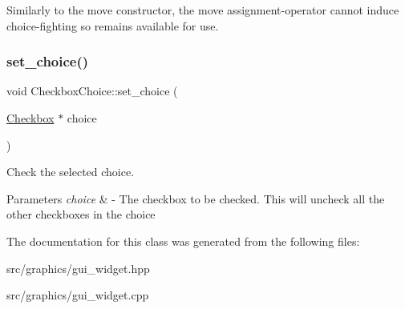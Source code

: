 Similarly to the move constructor, the move assignment-\/operator cannot induce choice-\/fighting so remains available for use. \mbox{\label{class_checkbox_choice_a02298a96989fb9c74de92e3094a51466}} 
\subsubsection{\texorpdfstring{set\+\_\+choice()}{set\_choice()}}
{\footnotesize\ttfamily void Checkbox\+Choice\+::set\+\_\+choice (\begin{DoxyParamCaption}\item[{\mbox{\hyperlink{class_checkbox}{Checkbox}} $\ast$}]{choice }\end{DoxyParamCaption})}

Check the selected choice. 
\begin{DoxyParams}{Parameters}
{\em choice} & -\/ The checkbox to be checked. This will uncheck all the other checkboxes in the choice \\
\hline
\end{DoxyParams}


The documentation for this class was generated from the following files\+:\begin{DoxyCompactItemize}
\item 
src/graphics/gui\+\_\+widget.\+hpp\item 
src/graphics/gui\+\_\+widget.\+cpp\end{DoxyCompactItemize}
